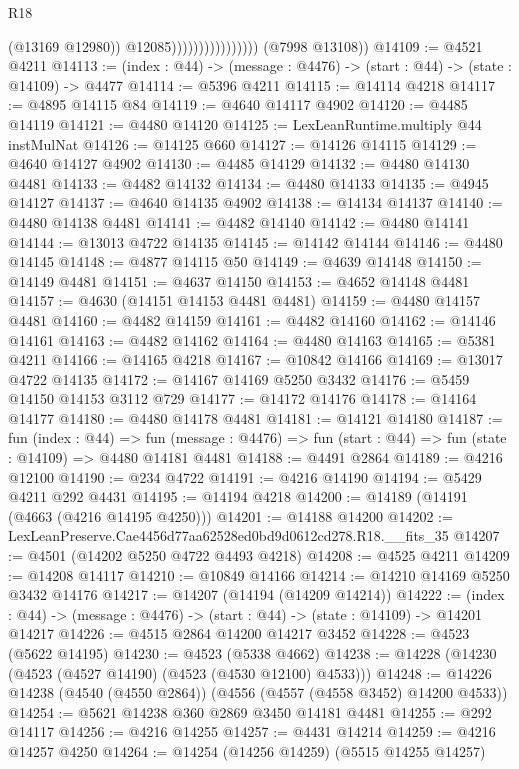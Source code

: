 \begin{lexlean}{R18}
\begin{coremodule}
                                        (@13169 @12980))
                                      @12085))))))))))))))))
      (@7998 @13108))
@14109 := @4521 @4211
@14113 := (index : @44) -> (message : @4476) -> (start : @44) -> (state : @14109) -> @4477
@14114 := @5396 @4211
@14115 := @14114 @4218
@14117 := @4895 @14115 @84
@14119 := @4640 @14117 @4902
@14120 := @4485 @14119
@14121 := @4480 @14120
@14125 := LexLeanRuntime.multiply @44 instMulNat
@14126 := @14125 @660
@14127 := @14126 @14115
@14129 := @4640 @14127 @4902
@14130 := @4485 @14129
@14132 := @4480 @14130 @4481
@14133 := @4482 @14132
@14134 := @4480 @14133
@14135 := @4945 @14127
@14137 := @4640 @14135 @4902
@14138 := @14134 @14137
@14140 := @4480 @14138 @4481
@14141 := @4482 @14140
@14142 := @4480 @14141
@14144 := @13013 @4722 @14135
@14145 := @14142 @14144
@14146 := @4480 @14145
@14148 := @4877 @14115 @50
@14149 := @4639 @14148
@14150 := @14149 @4481
@14151 := @4637 @14150
@14153 := @4652 @14148 @4481
@14157 := @4630 (@14151 @14153 @4481 @4481)
@14159 := @4480 @14157 @4481
@14160 := @4482 @14159
@14161 := @4482 @14160
@14162 := @14146 @14161
@14163 := @4482 @14162
@14164 := @4480 @14163
@14165 := @5381 @4211
@14166 := @14165 @4218
@14167 := @10842 @14166
@14169 := @13017 @4722 @14135
@14172 := @14167 @14169 @5250 @3432
@14176 := @5459 @14150 @14153 @3112 @729
@14177 := @14172 @14176
@14178 := @14164 @14177
@14180 := @4480 @14178 @4481
@14181 := @14121 @14180
@14187 := fun (index : @44) =>
  fun (message : @4476) => fun (start : @44) => fun (state : @14109) => @4480 @14181 @4481
@14188 := @4491 @2864
@14189 := @4216 @12100
@14190 := @234 @4722
@14191 := @4216 @14190
@14194 := @5429 @4211 @292 @4431
@14195 := @14194 @4218
@14200 := @14189 (@14191 (@4663 (@4216 @14195 @4250)))
@14201 := @14188 @14200
@14202 := LexLeanPreserve.Cae4456d77aa62528ed0bd9d0612cd278.R18.__fits_35
@14207 := @4501 (@14202 @5250 @4722 @4493 @4218)
@14208 := @4525 @4211
@14209 := @14208 @14117
@14210 := @10849 @14166
@14214 := @14210 @14169 @5250 @3432 @14176
@14217 := @14207 (@14194 (@14209 @14214))
@14222 := (index : @44) -> (message : @4476) -> (start : @44) -> (state : @14109) -> @14201 @14217
@14226 := @4515 @2864 @14200 @14217 @3452
@14228 := @4523 (@5622 @14195)
@14230 := @4523 (@5338 @4662)
@14238 := @14228 (@14230 (@4523 (@4527 @14190) (@4523 (@4530 @12100) @4533)))
@14248 := @14226 @14238 (@4540 (@4550 @2864)) (@4556 (@4557 (@4558 @3452) @14200 @4533))
@14254 := @5621 @14238 @360 @2869 @3450 @14181 @4481
@14255 := @292 @14117
@14256 := @4216 @14255
@14257 := @4431 @14214
@14259 := @4216 @14257 @4250
@14264 := @14254 (@14256 @14259) (@5515 @14255 @14257)

\end{coremodule}
\end{lexlean}

